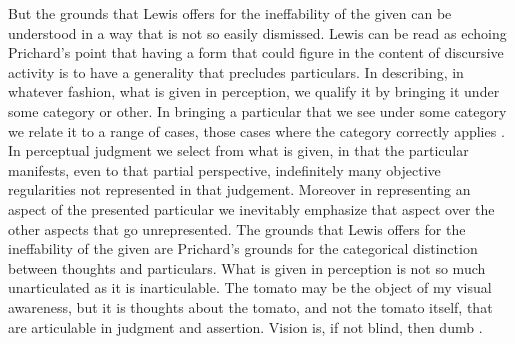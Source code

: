 \documentclass[12pt]{article}
\begin{document}
But the grounds that Lewis offers for the ineffability of the given can be understood in a way that is not so easily dismissed. Lewis can be read as echoing Prichard's \citeyearpar[44]{Prichard:1909yg} point that having a form that could figure in the content of discursive activity is to have a generality that precludes particulars. In describing, in whatever fashion, what is given in perception, we qualify it by bringing it under some category or other. In bringing a particular that we see under some category we relate it to a range of cases, those cases where the category correctly applies \citep[see][]{Travis:2005ys,Travis:2008uq}. In perceptual judgment we select from what is given, in that the particular manifests, even to that partial perspective, indefinitely many objective regularities not represented in that judgement. Moreover in representing an aspect of the presented particular we inevitably emphasize that aspect over the other aspects that go unrepresented. The grounds that Lewis offers for the ineffability of the given are Prichard's grounds for the categorical distinction between thoughts and particulars. What is given in perception is not so much unarticulated as it is inarticulable. The tomato may be the object of my visual awareness, but it is thoughts about the tomato, and not the tomato itself, that are articulable in judgment and assertion. Vision is, if not blind, then dumb \citep[see][]{Austin:1962lr,Travis:2004kx}.

\end{document}
